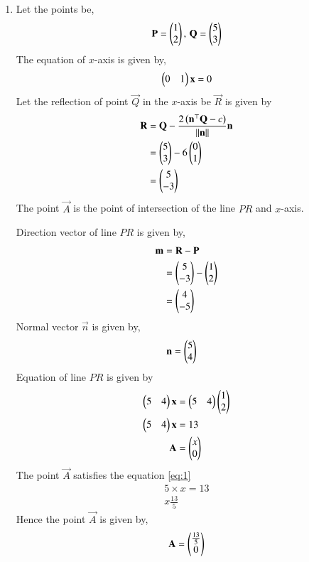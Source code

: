 \documentclass[journal,12pt,twocolumn]{IEEEtran}
\begin{document}
\begin{enumerate}
\begin{enumerate}
\item Let the points be,
\begin{align}
\mathbf{P} = \begin{pmatrix}1\\2\end{pmatrix}, \, \mathbf{Q} = \begin{pmatrix}5\\3\end{pmatrix}
\end{align}
The equation of $x$-axis is given by,
\begin{align}
\begin{pmatrix}0&1\end{pmatrix}\mathbf{x} = 0
\end{align}
Let the reflection of point $\vec{Q}$ in the $x$-axis be $\vec{R}$ is given by
\begin{align}
\mathbf{R} &= \mathbf{Q} -\frac{2\left(\mathbf{n}^{\top}\mathbf{Q}-c\right)}{\left\lVert\mathbf{n}\right\rVert}\mathbf{n}\\
&= \begin{pmatrix}5\\3\end{pmatrix} - 6\begin{pmatrix}0\\1\end{pmatrix}\\
&= \begin{pmatrix}5\\-3\end{pmatrix}
\end{align}
The point $\vec{A}$ is the point of intersection of the line $PR$ and $x$-axis.

Direction vector of line $PR$ is given by,
\begin{align}
\mathbf{m} &= \mathbf{R} - \mathbf{P}\\
&= \begin{pmatrix}5\\-3\end{pmatrix} - \begin{pmatrix}1\\2\end{pmatrix}\\
&= \begin{pmatrix}4\\-5\end{pmatrix}
\end{align}
Normal vector $\vec{n}$ is given by,
\begin{align}
\mathbf{n} &= \begin{pmatrix}5\\4\end{pmatrix}
\end{align}
Equation of line $PR$ is given by
\begin{align}
\begin{pmatrix}5&4\end{pmatrix}\mathbf{x} &= \begin{pmatrix}5&4\end{pmatrix}\begin{pmatrix}1\\2\end{pmatrix}\\
\begin{pmatrix}5&4\end{pmatrix}\mathbf{x} &= 13
\label{eq:1}\\
\mathbf{A} &= \begin{pmatrix}x\\0\end{pmatrix}
\end{align}
The point $\vec{A}$ satisfies the equation \eqref{eq:1}
\begin{align}
5\times x = 13\\
x \frac{13}{5}
\end{align}
Hence the point $\vec{A}$ is given by,
\begin{align}
\mathbf{A} = \begin{pmatrix}\frac{13}{5}\\0\end{pmatrix}
\end{align}
\end{enumerate}
\end{enumerate}
\end{document}
